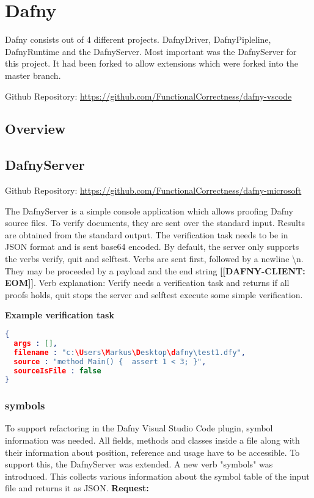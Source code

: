 \section{Dafny}
Dafny consists out of 4 different projects. DafnyDriver, DafnyPipleline, DafnyRuntime and the DafnyServer. Most important was the DafnyServer for this project. It had been forked to allow extensions which were forked into the master branch. 

Github Repository: \href{https://github.com/FunctionalCorrectness/dafny-vscode}{https://github.com/FunctionalCorrectness/dafny-vscode}

\subsection{Overview}



\subsection{DafnyServer}
Github Repository: \href{https://github.com/FunctionalCorrectness/dafny-microsoft}{https://github.com/FunctionalCorrectness/dafny-microsoft}

The DafnyServer is a simple console application which allows proofing Dafny source files. To verify documents, they are sent over the standard input. Results are obtained from the standard output. The verification task needs to be in JSON format  and is sent base64 encoded. By default, the server only supports the verbs verify, quit and selftest. Verbs are sent first, followed by a newline \textbackslash{n}. They may be proceeded by a payload and the end string \textbf{[[DAFNY-CLIENT: EOM]]}. \newline 
Verb explanation: Verify needs a verification task and returns if all proofs holds, quit stops the server and selftest execute some simple verification. \newline

\textbf{Example verification task}
\begin{lstlisting}[language=json,firstnumber=1]
{
  args : [],
  filename : "c:\Users\Markus\Desktop\dafny\test1.dfy",
  source : "method Main() {  assert 1 < 3; }",
  sourceIsFile : false
}

\end{lstlisting}

\subsubsection{symbols}
To support refactoring in the Dafny Visual Studio Code plugin, symbol information was needed. All fields, methods and classes inside a file along with their information about position, reference and usage have to be accessible. To support this, the DafnyServer was extended. A new verb "symbols" was introduced. This collects various information about the symbol table of the input file and returns it as JSON. 
\newline\newline
\textbf{Request: }

